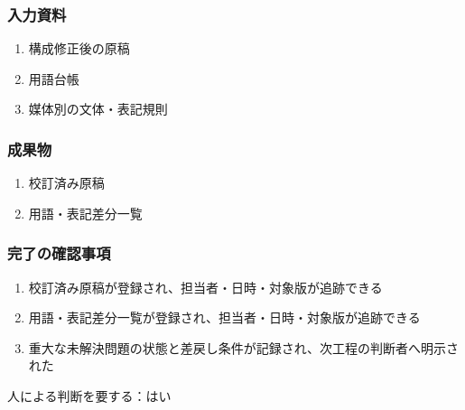 \documentclass[a4paper,11pt]{article}
\begin{document}
\subsubsection*{入力資料}
\begin{enumerate}[leftmargin=2em,itemsep=0.35em]
\item 構成修正後の原稿
\item 用語台帳
\item 媒体別の文体・表記規則
\end{enumerate}
\subsubsection*{成果物}
\begin{enumerate}[leftmargin=2em,itemsep=0.35em]
\item 校訂済み原稿
\item 用語・表記差分一覧
\end{enumerate}
\subsubsection*{完了の確認事項}
\begin{enumerate}[leftmargin=2em,itemsep=0.35em]
\item 校訂済み原稿が登録され、担当者・日時・対象版が追跡できる
\item 用語・表記差分一覧が登録され、担当者・日時・対象版が追跡できる
\item 重大な未解決問題の状態と差戻し条件が記録され、次工程の判断者へ明示された
\end{enumerate}
\par 人による判断を要する：はい\par\medskip
\end{document}
